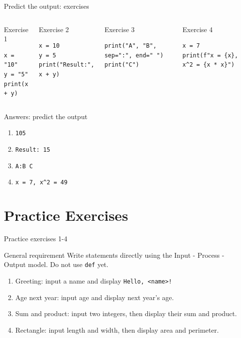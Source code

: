 \documentclass[aspectratio=169,10pt]{beamer}
\begin{document}
\begin{frame}[fragile]{Predict the output: exercises}
\begin{columns}[T,onlytextwidth]
\begin{block}{Exercise 1}
\begin{lstlisting}
x = "10"
y = "5"
print(x + y)
\end{lstlisting}
\end{block}
\begin{block}{Exercise 2}
\begin{lstlisting}
x = 10
y = 5
print("Result:", x + y)
\end{lstlisting}
\end{block}
\begin{block}{Exercise 3}
\begin{lstlisting}
print("A", "B", sep=":", end=" ")
print("C")
\end{lstlisting}
\end{block}
\begin{block}{Exercise 4}
\begin{lstlisting}
x = 7
print(f"x = {x}, x^2 = {x * x}")
\end{lstlisting}
\end{block}
\end{columns}
\end{frame}

\begin{frame}{Answers: predict the output}
\begin{enumerate}
  \item \texttt{105}
  \item \texttt{Result: 15}
  \item \texttt{A:B C}
  \item \texttt{x = 7, x\string^2 = 49}
\end{enumerate}
\end{frame}

\section{Practice Exercises}

\begin{frame}{Practice exercises 1-4}
\begin{block}{General requirement}
Write statements directly using the Input - Process - Output model. Do not use \texttt{def} yet.
\end{block}
\begin{enumerate}
  \item Greeting: input a name and display \texttt{Hello, <name>!}
  \item Age next year: input age and display next year's age.
  \item Sum and product: input two integers, then display their sum and product.
  \item Rectangle: input length and width, then display area and perimeter.
\end{enumerate}
\end{frame}
\end{document}
